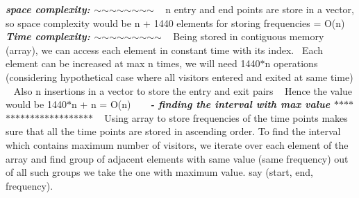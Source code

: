  {\bfseries{{\itshape space complexity\+: \texorpdfstring{$\sim$}{\string~}\texorpdfstring{$\sim$}{\string~}\texorpdfstring{$\sim$}{\string~}\texorpdfstring{$\sim$}{\string~}\texorpdfstring{$\sim$}{\string~}\texorpdfstring{$\sim$}{\string~}\texorpdfstring{$\sim$}{\string~}\texorpdfstring{$\sim$}{\string~}}}} ~\newline
n entry and end points are store in a vector, so space complexity would be n + 1440 elements for storing frequencies = O(n) ~\newline
 {\bfseries{{\itshape Time complexity\+: \texorpdfstring{$\sim$}{\string~}\texorpdfstring{$\sim$}{\string~}\texorpdfstring{$\sim$}{\string~}\texorpdfstring{$\sim$}{\string~}\texorpdfstring{$\sim$}{\string~}\texorpdfstring{$\sim$}{\string~}\texorpdfstring{$\sim$}{\string~}\texorpdfstring{$\sim$}{\string~}\texorpdfstring{$\sim$}{\string~}}}} ~\newline
Being stored in contiguous memory (array), we can access each element in constant time with its index.~\newline
Each element can be increased at max n times, we will need 1440\texorpdfstring{$\ast$}{*}n operations ~\newline
(considering hypothetical case where all visitors entered and exited at same time) ~\newline
Also n insertions in a vector to store the entry and exit pairs ~\newline
Hence the value would be 1440\texorpdfstring{$\ast$}{*}n + n = O(n) ~\newline
~\newline
{\bfseries{{\itshape  -\/ finding the interval with max value \texorpdfstring{$\ast$}{*}\texorpdfstring{$\ast$}{*}\texorpdfstring{$\ast$}{*}\texorpdfstring{$\ast$}{*}\texorpdfstring{$\ast$}{*}\texorpdfstring{$\ast$}{*}\texorpdfstring{$\ast$}{*}\texorpdfstring{$\ast$}{*}\texorpdfstring{$\ast$}{*}\texorpdfstring{$\ast$}{*}\texorpdfstring{$\ast$}{*}\texorpdfstring{$\ast$}{*}\texorpdfstring{$\ast$}{*}\texorpdfstring{$\ast$}{*}\texorpdfstring{$\ast$}{*}\texorpdfstring{$\ast$}{*}\texorpdfstring{$\ast$}{*}\texorpdfstring{$\ast$}{*}\texorpdfstring{$\ast$}{*}\texorpdfstring{$\ast$}{*}\texorpdfstring{$\ast$}{*}\texorpdfstring{$\ast$}{*}}}} ~\newline
Using array to store frequencies of the time points makes sure that all the time points are stored in ascending order. To find the interval which contains maximum number of visitors, we iterate over each element of the array and find group of adjacent elements with same value (same frequency) out of all such groups we take the one with maximum value. say (start, end, frequency). ~\newline
